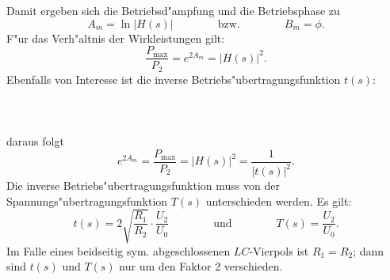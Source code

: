 \nit Damit ergeben sich die Betriebsd"ampfung und die Betriebsphase zu
\begin{equation*}
A_m=\ln{|H(s)|}\qquad\qquad\text{bzw.}\qquad\qquad B_m=\phi.
\end{equation*}
\nit F"ur das Verh"altnis der Wirkleistungen gilt:
\begin{equation}
\frac{P_{\max}}{P_2}=e^{2 A_m}=|H(s)|^{2}.
\end{equation}
Ebenfalls von Interesse ist die inverse
Betriebs\-"uber\-tragungs\-funktion $t(s)$:\\~~\\
\\~~\\
daraus folgt
\begin{equation*}
e^{2 A_m}=\frac{P_{\max}}{P_2}=|H(s)|^2=\frac{1}{|t(s)|^2}.
\end{equation*}
Die inverse Betriebs\-"uber\-tragungs\-funktion muss von der
Spannungs"ubertragungsfunktion $T(s)$ unterschieden werden. Es
gilt:
\begin{equation*}
t(s)=2 \sqrt{\frac{R_1}{R_2}} \cdot \frac{U_2}{U_0}\qquad\qquad\text{und}\qquad\qquad T(s)=\frac{U_2}{U_0}.
\end{equation*}
Im Falle eines beidseitig sym. abgeschlossenen $LC$-Vierpols ist $R_1=R_2$;
dann sind $t(s)$ und $T(s)$ nur um den Faktor 2 verschieden.

